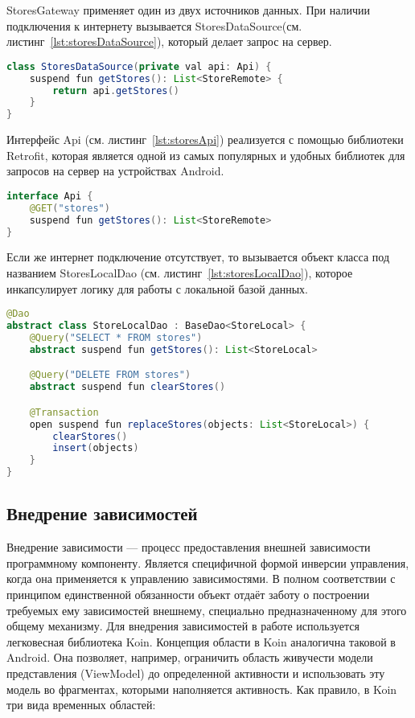 StoresGateway применяет один из двух источников данных. При наличии подключения к интернету вызывается StoresDataSource(см. листинг~\ref{lst:storesDataSource}), который делает запрос на сервер.

\begin{lstlisting}[language=Java,label={lst:storesDataSource},caption={StoresDataSource}]
class StoresDataSource(private val api: Api) {
    suspend fun getStores(): List<StoreRemote> {
        return api.getStores()
    }
}
\end{lstlisting}

Интерфейс Api (см. листинг~\ref{lst:storesApi}) реализуется с помощью библиотеки Retrofit, которая является одной из самых популярных и удобных библиотек для запросов на сервер на устройствах Android.

\begin{lstlisting}[language=Java,label={lst:storesApi},caption={Api}]
interface Api {
    @GET("stores")
    suspend fun getStores(): List<StoreRemote>
}
\end{lstlisting}

Если же интернет подключение отсутствует, то вызывается объект класса под названием StoresLocalDao (см. листинг~\ref{lst:storesLocalDao}), которое инкапсулирует логику для работы с локальной базой данных.
\begin{lstlisting}[language=Java,label={lst:storesLocalDao},caption={StoresLocalDao}]
@Dao
abstract class StoreLocalDao : BaseDao<StoreLocal> {
    @Query("SELECT * FROM stores")
    abstract suspend fun getStores(): List<StoreLocal>

    @Query("DELETE FROM stores")
    abstract suspend fun clearStores()

    @Transaction
    open suspend fun replaceStores(objects: List<StoreLocal>) {
        clearStores()
        insert(objects)
    }
}
\end{lstlisting}

\subsection{Внедрение зависимостей}
Внедрение зависимости — процесс предоставления внешней зависимости программному компоненту. Является специфичной формой инверсии управления, когда она применяется к управлению зависимостями. В полном соответствии с принципом единственной обязанности объект отдаёт заботу о построении требуемых ему зависимостей внешнему, специально предназначенному для этого общему механизму. Для внедрения зависимостей в работе используется легковесная библиотека Koin. Концепция области в Koin аналогична таковой в Android. Она позволяет, например, ограничить область живучести модели представления (ViewModel) до определенной активности и использовать эту модель во фрагментах, которыми наполняется активность. Как правило, в Koin три вида временных областей:

